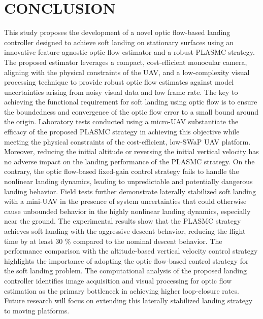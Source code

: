 \documentclass{IEEEtaes}
\begin{document}
\section{CONCLUSION}
\label{conclusion: section}
This study proposes the development of a novel optic flow-based landing controller designed to achieve soft landing on stationary surfaces using an innovative feature-agnostic optic flow estimator and a robust PLASMC strategy. 
The proposed estimator leverages a compact, cost-efficient monocular camera, aligning with the physical constraints of the UAV, and a low-complexity visual processing technique to provide robust optic flow estimates against model uncertainties arising from noisy visual data and low frame rate.
The key to achieving the functional requirement for soft landing using optic flow is to ensure the boundedness and convergence of the optic flow error to a small bound around the origin. 
Laboratory tests conducted using a micro-UAV substantiate the efficacy of the proposed PLASMC strategy in achieving this objective while meeting the physical constraints of the cost-efficient, low-SWaP UAV platform.
Moreover, reducing the initial altitude or reversing the initial vertical velocity has no adverse impact on the landing performance of the PLASMC strategy.
On the contrary, the optic flow-based fixed-gain control strategy fails to handle the nonlinear landing dynamics, leading to unpredictable and potentially dangerous landing behavior.
Field tests further demonstrate laterally stabilized soft landing with a mini-UAV in the presence of system uncertainties that could otherwise cause unbounded behavior in the highly nonlinear landing dynamics, especially near the ground.
The experimental results show that the PLASMC strategy achieves soft landing with the aggressive descent behavior, reducing the flight time by at least 30 \% compared to the nominal descent behavior.
The performance comparison with the altitude-based vertical velocity control strategy highlights the importance of adopting the optic flow-based control strategy for the soft landing problem.
The computational analysis of the proposed landing controller identifies image acquisition and visual processing for optic flow estimation as the primary bottleneck in achieving higher loop-closure rates. 
Future research will focus on extending this laterally stabilized landing strategy to moving platforms.



\end{document}
